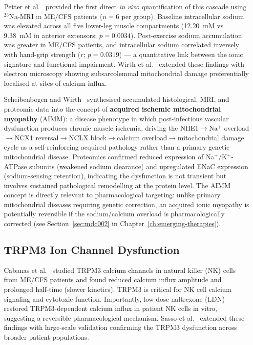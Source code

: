 Petter et al.~\cite{Petter2022sodium} provided the first direct \textit{in vivo} quantification of this cascade using $^{23}$Na-MRI in ME/CFS patients ($n=6$ per group). Baseline intracellular sodium was elevated across all five lower-leg muscle compartments (12.20~mM vs 9.38~mM in anterior extensors; $p=0.0034$). Post-exercise sodium accumulation was greater in ME/CFS patients, and intracellular sodium correlated inversely with hand-grip strength ($r$; $p=0.0319$) --- a quantitative link between the ionic signature and functional impairment. Wirth et al.~\cite{WirthScheibenbogen2021muscle} extended these findings with electron microscopy showing subsarcolemmal mitochondrial damage preferentially localised at sites of calcium influx.

Scheibenbogen and Wirth~\cite{Scheibenbogen2025muscle} synthesised accumulated histological, MRI, and proteomic data into the concept of \textbf{acquired ischemic mitochondrial myopathy} (AIMM): a disease phenotype in which post-infectious vascular dysfunction produces chronic muscle ischemia, driving the NHE1$\to$Na$^+$ overload$\to$NCX1 reversal$\to$NCLX block$\to$calcium overload$\to$mitochondrial damage cycle as a self-reinforcing acquired pathology rather than a primary genetic mitochondrial disease. Proteomics confirmed reduced expression of Na$^+$/K$^+$-ATPase subunits (weakened sodium clearance) and upregulated ENaC expression (sodium-sensing retention), indicating the dysfunction is not transient but involves sustained pathological remodelling at the protein level. The AIMM concept is directly relevant to pharmacological targeting: unlike primary mitochondrial diseases requiring genetic correction, an acquired ionic myopathy is potentially reversible if the sodium/calcium overload is pharmacologically corrected (see Section~\ref{sec:mdc002} in Chapter~\ref{ch:emerging-therapies}).

\subsection{TRPM3 Ion Channel Dysfunction}

Cabanas et al.~\cite{Cabanas2024trpm3} studied TRPM3 calcium channels in natural killer (NK) cells from ME/CFS patients and found reduced calcium influx amplitude and prolonged half-time (slower kinetics). TRPM3 is critical for NK cell calcium signaling and cytotoxic function. Importantly, low-dose naltrexone (LDN) restored TRPM3-dependent calcium influx in patient NK cells in vitro, suggesting a reversible pharmacological mechanism. Sasso et al.~\cite{Sasso2026trpm3} extended these findings with large-scale validation confirming the TRPM3 dysfunction across broader patient populations.

